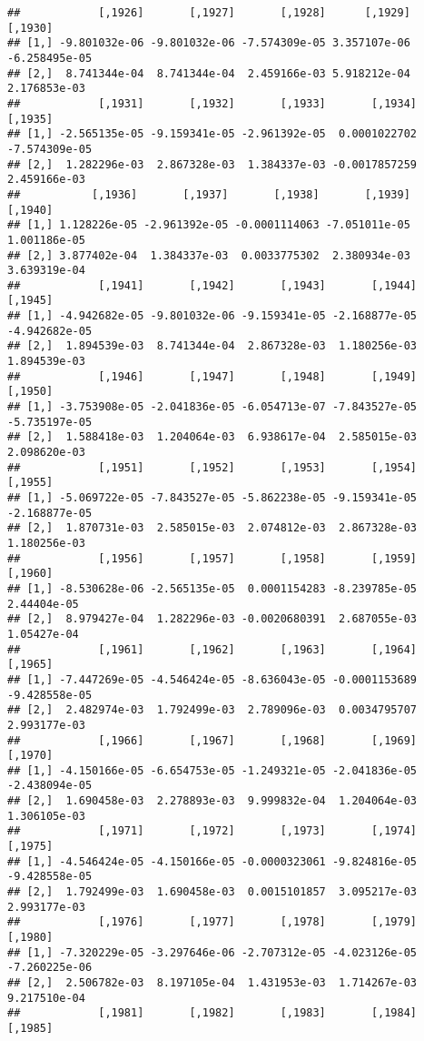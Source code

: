 \documentclass[
]{article}
\begin{document}
\begin{verbatim}
##            [,1926]       [,1927]       [,1928]      [,1929]       [,1930]
## [1,] -9.801032e-06 -9.801032e-06 -7.574309e-05 3.357107e-06 -6.258495e-05
## [2,]  8.741344e-04  8.741344e-04  2.459166e-03 5.918212e-04  2.176853e-03
##            [,1931]       [,1932]       [,1933]       [,1934]       [,1935]
## [1,] -2.565135e-05 -9.159341e-05 -2.961392e-05  0.0001022702 -7.574309e-05
## [2,]  1.282296e-03  2.867328e-03  1.384337e-03 -0.0017857259  2.459166e-03
##           [,1936]       [,1937]       [,1938]       [,1939]      [,1940]
## [1,] 1.128226e-05 -2.961392e-05 -0.0001114063 -7.051011e-05 1.001186e-05
## [2,] 3.877402e-04  1.384337e-03  0.0033775302  2.380934e-03 3.639319e-04
##            [,1941]       [,1942]       [,1943]       [,1944]       [,1945]
## [1,] -4.942682e-05 -9.801032e-06 -9.159341e-05 -2.168877e-05 -4.942682e-05
## [2,]  1.894539e-03  8.741344e-04  2.867328e-03  1.180256e-03  1.894539e-03
##            [,1946]       [,1947]       [,1948]       [,1949]       [,1950]
## [1,] -3.753908e-05 -2.041836e-05 -6.054713e-07 -7.843527e-05 -5.735197e-05
## [2,]  1.588418e-03  1.204064e-03  6.938617e-04  2.585015e-03  2.098620e-03
##            [,1951]       [,1952]       [,1953]       [,1954]       [,1955]
## [1,] -5.069722e-05 -7.843527e-05 -5.862238e-05 -9.159341e-05 -2.168877e-05
## [2,]  1.870731e-03  2.585015e-03  2.074812e-03  2.867328e-03  1.180256e-03
##            [,1956]       [,1957]       [,1958]       [,1959]     [,1960]
## [1,] -8.530628e-06 -2.565135e-05  0.0001154283 -8.239785e-05 2.44404e-05
## [2,]  8.979427e-04  1.282296e-03 -0.0020680391  2.687055e-03 1.05427e-04
##            [,1961]       [,1962]       [,1963]       [,1964]       [,1965]
## [1,] -7.447269e-05 -4.546424e-05 -8.636043e-05 -0.0001153689 -9.428558e-05
## [2,]  2.482974e-03  1.792499e-03  2.789096e-03  0.0034795707  2.993177e-03
##            [,1966]       [,1967]       [,1968]       [,1969]       [,1970]
## [1,] -4.150166e-05 -6.654753e-05 -1.249321e-05 -2.041836e-05 -2.438094e-05
## [2,]  1.690458e-03  2.278893e-03  9.999832e-04  1.204064e-03  1.306105e-03
##            [,1971]       [,1972]       [,1973]       [,1974]       [,1975]
## [1,] -4.546424e-05 -4.150166e-05 -0.0000323061 -9.824816e-05 -9.428558e-05
## [2,]  1.792499e-03  1.690458e-03  0.0015101857  3.095217e-03  2.993177e-03
##            [,1976]       [,1977]       [,1978]       [,1979]       [,1980]
## [1,] -7.320229e-05 -3.297646e-06 -2.707312e-05 -4.023126e-05 -7.260225e-06
## [2,]  2.506782e-03  8.197105e-04  1.431953e-03  1.714267e-03  9.217510e-04
##            [,1981]       [,1982]       [,1983]       [,1984]       [,1985]

\end{verbatim}
\end{document}
